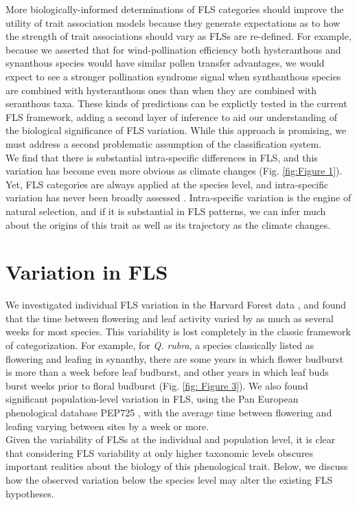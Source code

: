 \documentclass[12pt]{article}
\begin{document}
\indent More biologically-informed determinations of FLS categories should improve the utility of trait association models because they generate expectations as to how the strength of trait associations should vary as FLSs are re-defined. For example, because we asserted that for wind-pollination efficiency both hysteranthous and synanthous species would have similar pollen transfer advantages, we would expect to see a stronger pollination syndrome signal when synthanthous species are combined with hysteranthous ones than when they are combined with seranthous taxa. These kinds of predictions can be explictly tested in the current FLS framework, adding a second layer of inference to aid our understanding of the biological significance of FLS variation. While this approach is promising, we must address a second problematic assumption of the classification system. \\ %

\indent We find that there is substantial intra-specific differences in FLS, and this variation has become even more obvious as climate changes (Fig. \ref{fig:Figure 1}). Yet, FLS categories are always applied at the species level, and intra-specific variation has never been broadly assessed \citep{Gougherty2018}. Intra-specific variation is the engine of natural selection, and if it is substantial in FLS patterns, we can infer much about the origins of this trait as well as its trajectory as the climate changes.

\section*{Variation in FLS}
 \indent\indent We investigated individual FLS variation in the Harvard Forest data \citep{OKeefe2015}, and found that the time between flowering and leaf activity varied by as much as several weeks for most species. This variability is lost completely in the classic framework of categorization. For example, for  \textit{Q. rubra}, a species classically listed as flowering and leafing in synanthy, there are some years in which flower budburst is more than a week before leaf budburst, and other years in which leaf buds burst weeks prior to floral budburst (Fig. \ref{fig: Figure 3}). We also found significant population-level variation in FLS, using the Pan European phenological database PEP725 \citep{PEP725}, with the average time between flowering and leafing varying between sites by a week or more.\\
\indent Given the variability of FLSs at the individual and population level, it is clear that considering FLS variability at only higher taxonomic levels obscures important realities about the biology of this phenological trait. Below, we discuss how the observed variation below the species level may alter the existing FLS hypotheses.
\end{document}
